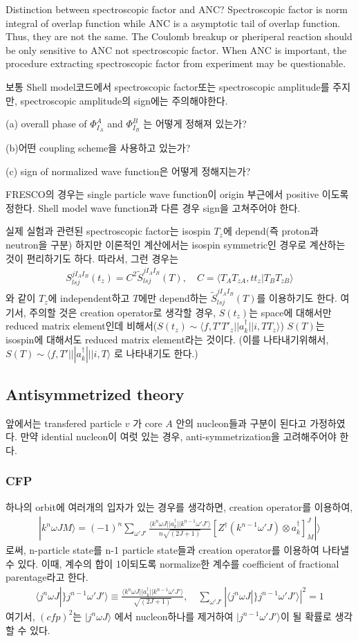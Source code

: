 \documentclass[11pt]{book}
\def\la{\langle}
\def\ra{\rangle}
\newcommand{\bea}{\begin{eqnarray}}
\newcommand{\eea}{\end{eqnarray}}
\begin{document}
{\color{red} Distinction between spectroscopic factor and ANC?} Spectroscopic factor is norm integral 
of overlap function while ANC is a asymptotic tail of overlap function. Thus, they are not 
the same. The Coulomb breakup or pheriperal reaction should be only sensitive to ANC not spectroscopic factor. 
When ANC is important, the procedure extracting spectroscopic factor from experiment may be questionable.  


보통 Shell model코드에서 spectroscopic factor또는 spectroscopic amplitude를 주지만,
spectroscopic amplitude의 sign에는 주의해야한다. 

(a) overall phase of $\Phi^A_{I_A}$ and $\Phi^B_{I_B}$ 는 어떻게 정해져 있는가?

(b)어떤 coupling scheme을 사용하고 있는가? 

(c) sign of normalized wave function은 어떻게 정해지는가? 

FRESCO의 경우는 single particle wave function이 origin 부근에서 positive 이도록 정한다.
Shell model wave function과 다른 경우 sign을 고쳐주어야 한다. 

실제 실험과 관련된 spectroscopic factor는 isospin $T_z$에 depend(즉 proton과 neutron을 구분) 하지만
이론적인 계산에서는 isospin symmetric인 경우로 계산하는 것이 편리하기도 하다. 
따라서, 그런 경우는 
\bea 
S^{j I_A I_B}_{lsj}(t_z)=C^2 \tilde{S}^{j I_A I_B}_{lsj}(T),\quad 
C=\la T_A T_{zA}, t t_z|T_B T_{zB}\ra 
\eea 
와 같이 $T_z$에 independent하고 $T$에만 depend하는  $\tilde{S}^{j I_A I_B}_{lsj}(T)$를 
이용하기도 한다. 여기서, 주의할 것은 creation operator로 생각할 경우, $S(t_z)$는 
space에 대해서만 reduced matrix element인데 비해서($S(t_z)\sim \la f,T' T'_z|| a_k^\dagger ||i, T T_z\ra $) $S(T)$는 isospin에 대해서도 reduced matrix element라는 것이다. 
(이를 나타내기위해서, $S(T)\sim \la f,T' ||| a_k^\dagger |||i, T \ra $ 로 나타내기도 한다.)

\subsection{Antisymmetrized theory}
앞에서는 transfered particle $v$ 가 core $A$ 안의 nucleon들과 구분이 된다고 가정하였다. 
만약 idential nucleon이 여럿 있는 경우, anti-symmetrization을 고려해주어야 한다. 

\subsubsection{CFP}
하나의 orbit에 여러개의 입자가 있는 경우를 생각하면, creation operator를 이용하여,
\bea 
|k^n \omega J M\ra =(-1)^n \sum_{\omega' J'} 
\frac{\la k^n \omega J || a^\dagger_k|| k^{n-1}\omega' J'\ra}{n\sqrt{(2J+1)}}
\left[ Z^\dagger(k^{n-1}\omega' J)\otimes a^\dagger_k 
 \right]^{J}_M|\ra  
\eea 
로써, n-particle state를 n-1 particle state들과 creation operator를 이용하여 나타낼 수 있다.
이때, 계수의 합이 1이되도록 normalize한 계수를 coefficient of fractional parentage라고 한다.
\bea 
\la j^n \omega J |\} j^{n-1} \omega' J'\ra 
 \equiv  \frac{\la k^n \omega J || a^\dagger_k|| k^{n-1}\omega' J'\ra}{\sqrt{(2J+1)}},\quad
 \sum_{\omega' J'} |\la j^n \omega J |\} j^{n-1} \omega' J'\ra|^2 =1
\eea   
여기서, $(cfp)^2$는  $|j^n \omega J\ra$ 에서 nucleon하나를 제거하여 $|j^{n-1} \omega' J'\ra$이
될 확률로 생각할 수 있다. 
\end{document}
